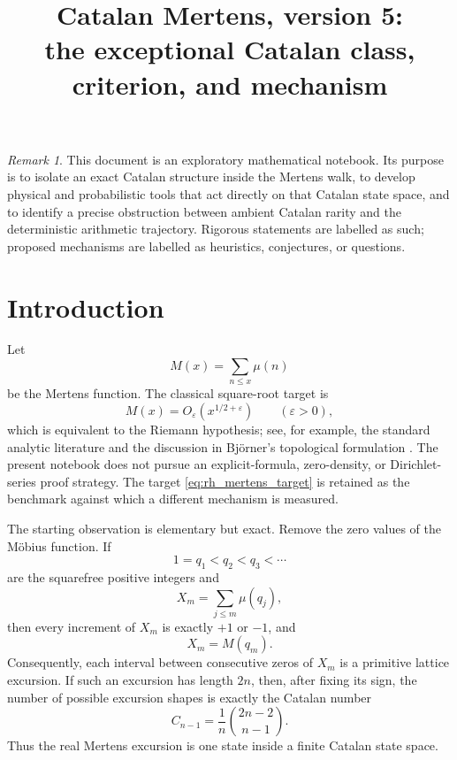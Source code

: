 \documentclass[11pt]{amsart}
\title[Catalan Mertens]{Catalan Mertens, version 5:\\the exceptional Catalan class, criterion, and mechanism}
\author{}
\date{}
\numberwithin{equation}{section}
\theoremstyle{plain}
\theoremstyle{definition}
\theoremstyle{remark}
\newtheorem{remark}[theorem]{Remark}
\newcommand{\Mob}{\mu}
\newcommand{\Mert}{M}
\newcommand{\Cat}{C}
\newcommand{\eps}{\varepsilon}
\begin{document}
\maketitle
\tableofcontents
\bigskip

\begin{remark}
\label{rem:exploratory_nature}
This document is an exploratory mathematical notebook.  Its purpose is to isolate an exact Catalan structure inside the Mertens walk, to develop physical and probabilistic tools that act directly on that Catalan state space, and to identify a precise obstruction between ambient Catalan rarity and the deterministic arithmetic trajectory.  Rigorous statements are labelled as such; proposed mechanisms are labelled as heuristics, conjectures, or questions.
\end{remark}

\section{Introduction}
\label{sec:introduction}

Let
\begin{equation}
\Mert(x)=\sum_{n\le x}\Mob(n)
\label{eq:mertens_definition}
\end{equation}
be the Mertens function.  The classical square-root target is
\begin{equation}
\Mert(x)=O_{\eps}\!\left(x^{1/2+\eps}\right)
\qquad (\eps>0),
\label{eq:rh_mertens_target}
\end{equation}
which is equivalent to the Riemann hypothesis; see, for example, the standard analytic literature and the discussion in Bj\"orner's topological formulation \cite{Bjorner2011}.  The present notebook does not pursue an explicit-formula, zero-density, or Dirichlet-series proof strategy.  The target \eqref{eq:rh_mertens_target} is retained as the benchmark against which a different mechanism is measured.

The starting observation is elementary but exact.  Remove the zero values of the M\"obius function.  If
\begin{equation}
1=q_1<q_2<q_3<\cdots
\label{eq:squarefree_enumeration}
\end{equation}
are the squarefree positive integers and
\begin{equation}
X_m=\sum_{j\le m}\Mob(q_j),
\label{eq:compressed_walk}
\end{equation}
then every increment of $X_m$ is exactly $+1$ or $-1$, and
\begin{equation}
X_m=\Mert(q_m).
\label{eq:compressed_equals_mertens}
\end{equation}
Consequently, each interval between consecutive zeros of $X_m$ is a primitive lattice excursion.  If such an excursion has length $2n$, then, after fixing its sign, the number of possible excursion shapes is exactly the Catalan number
\begin{equation}
\Cat_{n-1}=\frac{1}{n}\binom{2n-2}{n-1}.
\label{eq:primitive_catalan_count_intro}
\end{equation}
Thus the real Mertens excursion is one state inside a finite Catalan state space.
\end{document}
